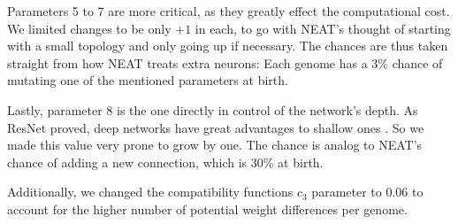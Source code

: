Parameters 5 to 7 are more critical, as they greatly effect the computational cost.\\
We limited changes to be only $+1$ in each, to go with NEAT's thought of starting with a small topology and only going up if necessary. The chances are thus taken straight from how NEAT treats extra neurons: Each genome has a 3\% chance of mutating one of the mentioned parameters at birth.

Lastly, parameter 8 is the one directly in control of the network's depth. As ResNet proved, deep networks have great advantages to shallow ones \cite{KaimingHe2015}. So we made this value very prone to grow by one. The chance is analog to NEAT's chance of adding a new connection, which is 30\% at birth.

Additionally, we changed the compatibility functions $c_3$ parameter to $0.06$ to account for the higher number of potential weight differences per genome.